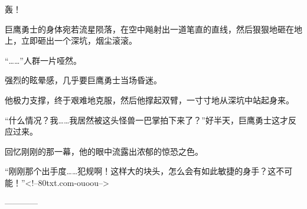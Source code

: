 \begin{this_body}
轰！

巨鹰勇士的身体宛若流星陨落，在空中飚射出一道笔直的直线，然后狠狠地砸在地上，立即砸出一个深坑，烟尘滚滚。

“……”人群一片哑然。

强烈的眩晕感，几乎要巨鹰勇士当场昏迷。

他极力支撑，终于艰难地克服，然后他撑起双臂，一寸寸地从深坑中站起身来。

“什么情况？我……我居然被这头怪兽一巴掌拍下来了？”好半天，巨鹰勇士这才反应过来。

回忆刚刚的那一幕，他的眼中流露出浓郁的惊恐之色。

“刚刚那个出手度……犯规啊！这样大的块头，怎么会有如此敏捷的身手？这不可能！”<!--80txt.com-ouoou-->

------------

\end{this_body}


